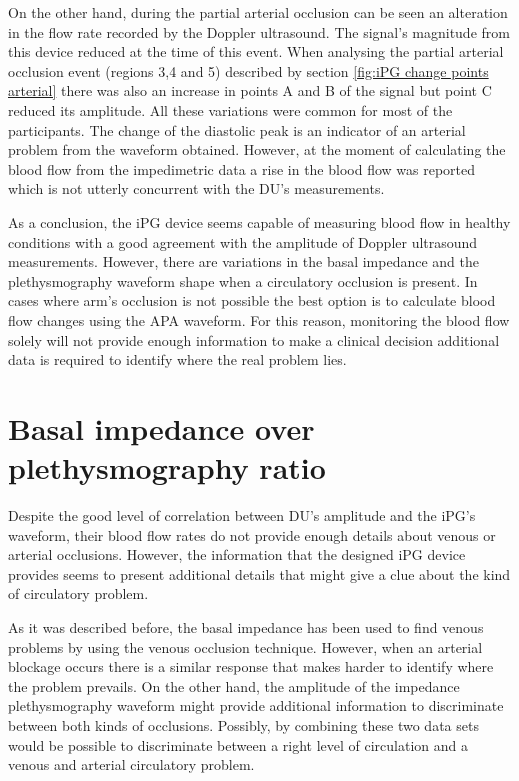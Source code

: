 On the other hand, during the partial arterial occlusion can be seen an alteration in the flow rate recorded by the Doppler ultrasound. The signal's magnitude from this device reduced at the time of this event. When analysing the partial arterial occlusion event (regions 3,4 and 5) described by section \ref{fig:iPG change points arterial} there was also an increase in points A  and B of the signal but point C reduced its amplitude. All these variations were common for most of the participants. The change of the diastolic peak is an indicator of an arterial problem from the waveform obtained. However, at the moment of calculating the blood flow from the impedimetric data a rise in the blood flow was reported which is not utterly concurrent with the DU's measurements. 

As a conclusion, the iPG device seems capable of measuring blood flow in healthy conditions with a good agreement with the amplitude of Doppler ultrasound measurements. However, there are variations in the basal impedance and the plethysmography waveform shape when a circulatory occlusion is present. In cases where arm's occlusion is not possible the best option is to calculate blood flow changes using the APA waveform. For this reason, monitoring the blood flow solely will not provide enough information to make a clinical decision additional data is required to identify where the real problem lies.


\section{Basal impedance over plethysmography ratio} %
\label{section discussion 4}

Despite the good level of correlation between DU's amplitude and the iPG's waveform, their blood flow rates do not provide enough details about venous or arterial occlusions. However, the information that the designed iPG device provides seems to present additional details that might give a clue about the kind of circulatory problem. 

As it was described before, the basal impedance has been used to find venous problems by using the venous occlusion technique. However, when an arterial blockage occurs there is a similar response that makes harder to identify where the problem prevails. On the other hand, the amplitude of the impedance plethysmography waveform might provide additional information to discriminate between both kinds of occlusions. Possibly, by combining these two data sets would be possible to discriminate between a right level of circulation and a venous and arterial circulatory problem. 

